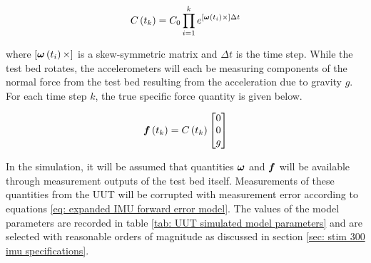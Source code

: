 \begin{align}
	C\left(t_k\right) = C_0 \prod_{i = 1}^k e^{\left[\boldsymbol{\omega}\left(t_i\right) \times\right] \Delta t}
\end{align}  

where $\left[\boldsymbol{\omega}\left(t_i\right) \times\right]$ is a skew-symmetric matrix and $\Delta t$ is the time step. While the test bed rotates, the accelerometers will each be measuring components of the normal force from the test bed resulting from the acceleration due to gravity $g$. For each time step $k$, the true specific force quantity is given below.

\begin{align}
	\boldsymbol{f}\left(t_k\right) = C\left(t_k\right) \begin{bmatrix} 0 \\ 0 \\ g \end{bmatrix}
\end{align}

In the simulation, it will be assumed that quantities $\boldsymbol{\omega}$ and $\boldsymbol{f}$ will be available through measurement outputs of the test bed itself. Measurements of these quantities from the UUT will be corrupted with measurement error according to equations \ref{eq: expanded IMU forward error model}. The values of the model parameters are recorded in table \ref{tab: UUT simulated model parameters} and are selected with reasonable orders of magnitude as discussed in section \ref{sec: stim 300 imu specifications}. 

